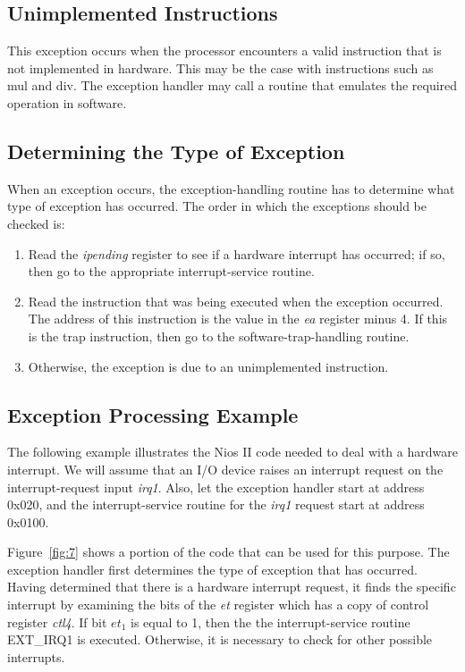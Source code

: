 \documentclass[11pt, twoside, pdftex]{article}
\begin{document}
\subsection{Unimplemented Instructions}

This exception occurs when the processor encounters a valid instruction that is
not implemented in hardware. This may be the case with instructions such as
{\sf mul} and {\sf div}. The exception handler may call a routine that emulates the
required operation in software.

\subsection{Determining the Type of Exception}

When an exception occurs, the exception-handling routine has to determine what
type of exception has occurred. The order in which the exceptions should be
checked is:
\begin{enumerate}
\item Read the {\it ipending} register to see if a hardware interrupt has occurred;
if so, then go to the appropriate interrupt-service routine.
\item Read the instruction that was being executed when the exception occurred.
The address of this instruction is the value in the {\it ea} register minus 4.
If this is the {\sf trap} instruction, then go to the software-trap-handling routine.
\item Otherwise, the exception is due to an unimplemented instruction.
\end{enumerate}

\subsection{Exception Processing Example}

The following example illustrates the Nios II code needed to deal with a hardware
interrupt. We will assume that an I/O device raises an interrupt request on the
interrupt-request input {\it irq1}. Also, let the exception handler start at 
address 0x020, and the interrupt-service routine for the {\it irq1} request
start at address 0x0100. 

Figure~\ref{fig:7} shows a portion of the code that can be used for this purpose.
The exception handler first determines the type of exception that has occurred.
Having determined that there is a hardware interrupt request, it finds the
specific interrupt by examining the bits of the {\it et} register which has
a copy of control register {\it ctl4}. If bit $et_1$ is equal to 1, then the
the interrupt-service routine EXT\_IRQ1 is executed. Otherwise, it is necessary
to check for other possible interrupts.
\end{document}
